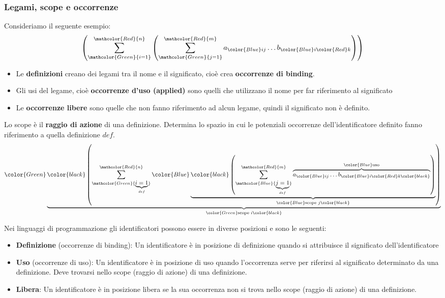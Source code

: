 \documentclass[a4paper]{article}
\begin{document}
\subsubsection{Legami, scope e occorrenze}
\begin{definition}
  Consideriamo il seguente esempio:
  \[
    \left( 
      \sum_{\mathcolor{Green}{i=1}}^{\mathcolor{Red}{n}}
      \left( 
        \sum_{\mathcolor{Green}{j=1}}^{\mathcolor{Red}{m}} a_{\color{Blue}ij} \ldots b_{\color{Blue}i\color{Red}k}
      \right) 
    \right) 
  \] 
  \begin{itemize}
    \item \color{Green}Le \textbf{definizioni} creano dei legami tra il nome e
      il significato, cioè crea \textbf{occorrenze di binding}.\color{black}

    \item \color{Blue}Gli usi del legame, cioè \textbf{occorrenze d'uso (applied)}
      sono quelli che utilizzano il nome per far riferimento al significato\color{black}

    \item \color{Red}Le \textbf{occorrenze libere} sono quelle che non fanno riferimento
      ad alcun legame, quindi il significato non è definito.\color{black}
  \end{itemize}
\end{definition}

\begin{definition}[Scope]
  Lo scope è il \textbf{raggio di azione} di una definizione. Determina lo spazio in
  cui le potenziali occorrenze dell'identificatore definito fanno riferimento a
  quella definizione \( def \).
  \[
    \color{Green}\underbrace{\color{black}
    \left( 
      \sum_{\mathcolor{Green}{\underbrace{i=1}_{def}}}^{\mathcolor{Red}{n}}
      \color{Blue}\underbrace{\color{black}
      \left( 
        \sum_{\mathcolor{Blue}{\underbrace{j=1}_{def}}}^{\mathcolor{Red}{m}} \overbrace{a_{\color{Blue}ij} \ldots b_{\color{Blue}i\color{Red}k\color{black}}}^{\color{Blue}\text{uso}}
      \right)}_{\color{Blue}\text{scope } j\color{black}}
    \right)}_{\color{Green}\text{scope } i\color{black}}
  \] 
\end{definition}

\vspace{1em}
\noindent
Nei linguaggi di programmazione gli identificatori possono essere in diverse posizioni
e sono le seguenti:
\begin{itemize}
  \item \textbf{Definizione} (occorrenze di binding): Un identificatore è in posizione di definizione
    quando si attribuisce il significato dell'identificatore

  \item \textbf{Uso} (occorrenze di uso): Un identificatore è in posizione di
    uso quando l'occorrenza serve per riferirsi al significato determinato da una
    definizione. Deve trovarsi nello scope (raggio di azione) di una definizione.

  \item \textbf{Libera}: Un identificatore è in posizione libera se la sua
    occorrenza non si trova nello scope (raggio di azione) di una definizione.
\end{itemize}
\end{document}
